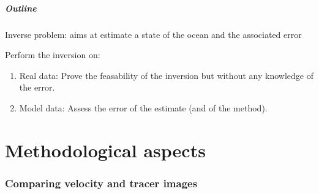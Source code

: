 \documentclass[compress,slidescentered,notes=show]{beamer}
\begin{document}
\begin{frame}
  \frametitle{Outline}

  \begin{block}{}
    Inverse problem: aims at estimate a state of the ocean and the associated error
  \end{block}

  \begin{block}{Perform the inversion on:}
  \begin{enumerate}
    \item Real data: Prove the feasability of the inversion but without any knowledge of the error.%
    \item Model data: Assess the error of the estimate (and of the method).
  \end{enumerate}
  \end{block}
\end{frame}

\part{Methodological aspects}

\begin{frame}
  \frametitle{\insertromanpartnumber \hspace{1em} \insertpart}
  \tableofcontents[hideotherpart]
\end{frame}
%
\section{Comparing velocity and tracer images}
\thesection
\end{document}
